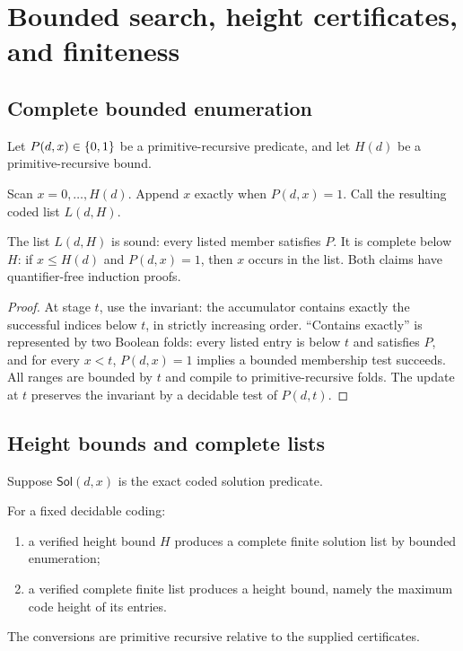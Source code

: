 \section{Bounded search, height certificates, and finiteness}

\subsection{Complete bounded enumeration}

Let \(P(d,x)\in\{0,1\}\) be a primitive-recursive predicate, and let \(H(d)\) be a
primitive-recursive bound.

\begin{construction}
Scan \(x=0,\ldots,H(d)\).  Append \(x\) exactly when \(P(d,x)=1\).
Call the resulting coded list \(L(d,H)\).
\end{construction}

\begin{theorem}
The list \(L(d,H)\) is sound:
every listed member satisfies \(P\).  It is complete below \(H\):
if \(x\le H(d)\) and \(P(d,x)=1\), then \(x\) occurs in the list.
Both claims have quantifier-free induction proofs.
\end{theorem}

\begin{proof}
At stage \(t\), use the invariant:
the accumulator contains exactly the successful indices below \(t\), in
strictly increasing order.  ``Contains exactly'' is represented by two
Boolean folds: every listed entry is below \(t\) and satisfies \(P\), and
for every \(x<t\), \(P(d,x)=1\) implies a bounded membership test succeeds.
All ranges are bounded by \(t\) and compile to primitive-recursive folds.
The update at \(t\) preserves the invariant by a decidable test of \(P(d,t)\).
\end{proof}

\subsection{Height bounds and complete lists}

Suppose \(\mathsf{Sol}(d,x)\) is the exact coded solution predicate.

\begin{theorem}
For a fixed decidable coding:
\begin{enumerate}[label=(\roman*)]
\item a verified height bound \(H\) produces a complete finite solution list
      by bounded enumeration;
\item a verified complete finite list produces a height bound, namely the
      maximum code height of its entries.
\end{enumerate}
The conversions are primitive recursive relative to the supplied
certificates.
\end{theorem}

